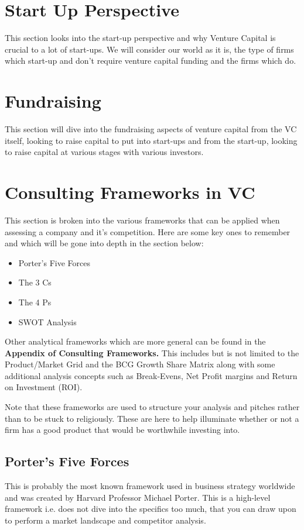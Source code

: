 \documentclass[a4paper]{article}
\begin{document}
{\newpage
\section{Start Up Perspective}
This section looks into the start-up perspective and why Venture Capital is crucial to a lot of start-ups. We will consider our world as it is, the type of firms which start-up and don't require venture capital funding and the firms which do.

\newpage
\section{Fundraising}
This section will dive into the fundraising aspects of venture capital from the VC itself, looking to raise capital to put into start-ups and from the start-up, looking to raise capital at various stages with various investors.



\newpage
\section{Consulting Frameworks in VC}
This section is broken into the various frameworks that can be applied when assessing a company and it's competition. Here are some key ones to remember and which will be gone into depth in the section below:
\begin{itemize}
	\item Porter's Five Forces
	\item The 3 Cs
	\item The 4 Ps
	\item SWOT Analysis
\end{itemize}
Other analytical frameworks which are more general can be found in the \textbf{Appendix of Consulting Frameworks.} This includes but is not limited to the Product/Market Grid and the BCG Growth Share Matrix along with some additional analysis concepts such as Break-Evens, Net Profit margins and Return on Investment (ROI).

\vspace{5pt}
\noindent Note that these frameworks are used to structure your analysis and pitches rather than to be stuck to religiously. These are here to help illuminate whether or not a firm has a good product that would be worthwhile investing into.

\subsection{Porter's Five Forces}
This is probably the most known framework used in business strategy worldwide and was created by Harvard Professor Michael Porter. This is a high-level framework i.e. does not dive into the specifics too much, that you can draw upon to perform a market landscape and competitor analysis. 

}
\end{document}

